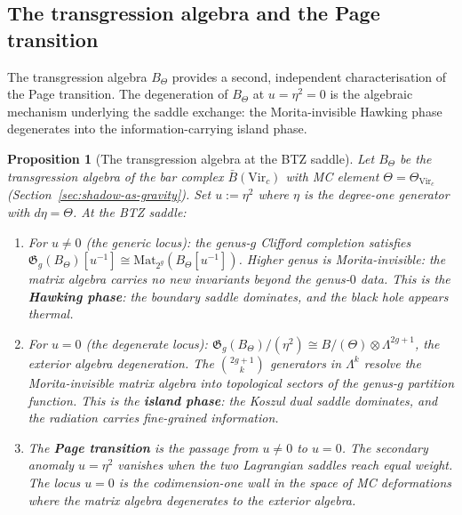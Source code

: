 \documentclass[11pt,reqno]{amsart}
\newtheorem{proposition}[theorem]{Proposition}
\theoremstyle{definition}
\theoremstyle{remark}
\providecommand{\barB}{\bar{B}}
\begin{document}
\subsection{The transgression algebra and the Page transition}

The transgression algebra $B_\Theta$ provides a second,
independent characterisation of the Page transition. The
degeneration of $B_\Theta$ at $u = \eta^2 = 0$ is the algebraic
mechanism underlying the saddle exchange: the Morita-invisible
Hawking phase degenerates into the information-carrying island
phase.

\begin{proposition}[The transgression algebra at the BTZ saddle]
\label{prop:transgression-btz}
Let $B_\Theta$ be the transgression algebra of the bar complex
$\barB(\mathrm{Vir}_c)$ with MC element
$\Theta = \Theta_{\mathrm{Vir}_c}$
(Section~\textup{\ref{sec:shadow-as-gravity}}). Set
$u := \eta^2$ where $\eta$ is the degree-one generator with
$d\eta = \Theta$. At the BTZ saddle:
\begin{enumerate}[label=\textup{(\roman*)}]
\item For $u \ne 0$ (the generic locus): the genus-$g$
  Clifford completion satisfies
  $\mathfrak{G}_g(B_\Theta)[u^{-1}]
  \cong \mathrm{Mat}_{2^g}(B_\Theta[u^{-1}])$.
  Higher genus is Morita-invisible: the matrix algebra carries
  no new invariants beyond the genus-$0$ data.
  This is the \textbf{Hawking phase}: the boundary saddle
  dominates, and the black hole appears thermal.
\item For $u = 0$ (the degenerate locus):
  $\mathfrak{G}_g(B_\Theta)/(\eta^2)
  \cong B/(\Theta) \otimes \Lambda^{2g+1}$,
  the exterior algebra degeneration. The
  $\binom{2g+1}{k}$ generators in $\Lambda^k$ resolve the
  Morita-invisible matrix algebra into topological sectors of the
  genus-$g$ partition function.
  This is the \textbf{island phase}: the Koszul dual saddle
  dominates, and the radiation carries fine-grained information.
\item The \textbf{Page transition} is the passage from $u \ne 0$
  to $u = 0$. The secondary anomaly
  $u = \eta^2$ vanishes when the two Lagrangian saddles reach
  equal weight. The locus $u = 0$ is the
  codimension-one wall in the space of MC deformations where
  the matrix algebra degenerates to the exterior algebra.
\end{enumerate}
\end{proposition}
\end{document}
